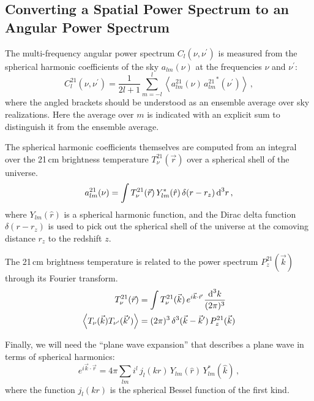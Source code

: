 \begin{bibunit}
\begin{subappendices}
\section{Converting a Spatial Power Spectrum to an Angular Power Spectrum}
\label{app:spatial-to-angular}

The multi-frequency angular power spectrum $C_l(\nu, \nu^\prime)$ is measured from the spherical
harmonic coefficients of the sky $a_{lm}(\nu)$ at the frequencies $\nu$ and $\nu^\prime$:
\begin{equation}
    C^{21}_l(\nu, \nu^\prime) = \frac{1}{2l+1}\sum_{m = -l}^l \left\langle
        a^{21}_{lm}(\nu) \, {a^{21}_{lm}}^*(\nu^\prime)
    \right\rangle\,,
\end{equation}
where the angled brackets should be understood as an ensemble average over sky realizations. Here
the average over $m$ is indicated with an explicit sum to distinguish it from the ensemble average.

The spherical harmonic coefficients themselves are computed from an integral over the 21\,cm
brightness temperature $T^{21}_\nu(\vec r)$ over a spherical shell of the universe.
\begin{equation}
    a^{21}_{lm}(\nu) = \int T^{21}_\nu(\vec r) \, Y_{lm}^*(\hat r) \, \delta(r - r_z) \, {\textrm d}^3r\,,
\end{equation}
where $Y_{lm}(\hat r)$ is a spherical harmonic function, and the Dirac delta function
$\delta(r-r_z)$ is used to pick out the spherical shell of the universe at the comoving distance
$r_z$ to the redshift $z$.

The 21\,cm brightness temperature is related to the power spectrum $P^{21}_z(\vec k)$ through its
Fourier transform.
\begin{align}
    T^{21}_\nu(\vec r) &=
        \int T^{21}_\nu(\vec k) \, e^{i\vec k\cdot\vec r} \, \frac{{\textrm d}^3k}{(2\pi)^3} \\
    \left\langle T_\nu(\vec k) T_{\nu^\prime}(\vec k^\prime) \right\rangle &=
        (2\pi)^3 \, \delta^3(\vec k - \vec k^\prime) \, P^{21}_z(\vec k)
\end{align}

Finally, we will need the ``plane wave expansion'' that describes a plane wave in terms of spherical
harmonics:
\begin{equation}
    e^{i\vec k\cdot\vec r} = 4\pi \sum_{lm} i^l \, j_l(kr) \, Y_{lm}(\hat r) \, Y^*_{lm}(\hat k)\,,
\end{equation}
where the function $j_l(kr)$ is the spherical Bessel function of the first kind.


\end{subappendices}
\end{bibunit}
